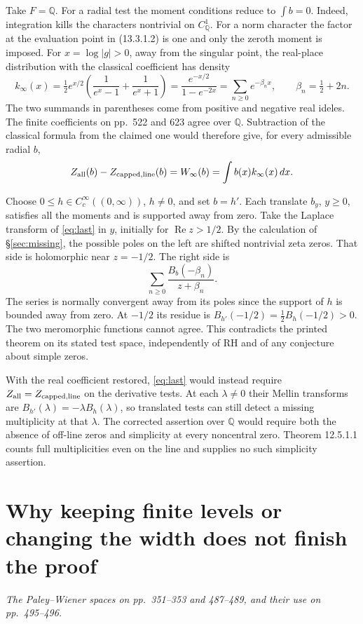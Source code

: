 \documentclass[11pt,letterpaper]{article}
\newcommand{\Q}{\mathbb Q}
\newcommand{\Rea}{\operatorname{Re}}
\newcommand{\dd}{\,d}
\newcommand{\step}[1]{\par\smallskip{\color{ink}\bfseries #1}\enspace}
\newcommand{\source}[1]{{\small\itshape #1}\par}
\newcommand{\pagepart}[2]{\clearpage\section{#1}\label{#2}}
\begin{document}
Take \(F=\Q\). For a radial test the moment conditions reduce to \(\int b=0\). Indeed, integration kills the characters nontrivial on \(C_\Q^1\). For a norm character the factor at the evaluation point in (13.3.1.2) is one and only the zeroth moment is imposed. For \(x=\log |g|>0\), away from the singular point, the real-place distribution with the classical coefficient has density
\[
 k_\infty(x)=\tfrac12 e^{x/2}\!
       \left(\frac1{e^x-1}+\frac1{e^x+1}\right)
      =\frac{e^{-x/2}}{1-e^{-2x}}=\sum_{n\ge0}e^{-\beta_n x},
 \qquad \beta_n=\tfrac12+2n .
\]
The two summands in parentheses come from positive and negative real ideles. The finite coefficients on pp.~522 and 623 agree over \(\Q\). Subtraction of the classical formula from the claimed one would therefore give, for every admissible radial \(b\),
\begin{equation}
       Z_{\rm all}(b)-Z_{\rm capped,line}(b)
            =W_\infty(b)=\int b(x)k_\infty(x)\dd x .
       \label{eq:last}
\end{equation}

Choose \(0\le h\in C_c^\infty((0,\infty))\), \(h\ne0\), and set \(b=h'\). Each translate \(b_y\), \(y\ge0\), satisfies all the moments and is supported away from zero. Take the Laplace transform of \eqref{eq:last} in \(y\), initially for \(\Rea z>1/2\). By the calculation of \S\ref{sec:missing}, the possible poles on the left are shifted nontrivial zeta zeros. That side is holomorphic near \(z=-1/2\). The right side is
\[
         \sum_{n\ge0}\frac{B_b(-\beta_n)}{z+\beta_n}.
\]
The series is normally convergent away from its poles since the support of \(h\) is bounded away from zero. At \(-1/2\) its residue is
\(B_{h'}(-1/2)=\tfrac12 B_h(-1/2)>0\).
The two meromorphic functions cannot agree. This contradicts the printed theorem on its stated test space, independently of RH and of any conjecture about simple zeros.

\step{What correcting the coefficient would leave.}
With the real coefficient restored, \eqref{eq:last} would instead require \(Z_{\rm all}=Z_{\rm capped,line}\) on the derivative tests. At each \(\lambda\ne0\) their Mellin transforms are \(B_{h'}(\lambda)=-\lambda B_h(\lambda)\), so translated tests can still detect a missing multiplicity at that \(\lambda\). The corrected assertion over \(\Q\) would require both the absence of off-line zeros and simplicity at every noncentral zero. Theorem 12.5.1.1 counts full multiplicities even on the line and supplies no such simplicity assertion.

\pagepart{Why keeping finite levels or changing the width does not finish the proof}{sec:limits}
\source{The Paley--Wiener spaces on pp.~351--353 and 487--489, and their use on pp.~495--496.}
\end{document}
